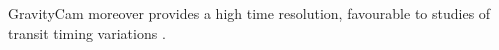 \documentclass{pasa}%
\begin{document}
GravityCam moreover provides a high time resolution, favourable to studies of transit timing variations \citep[e.g.][]{TTV,2009A&A...507..481C,2014A&A...565A...7C}.





\end{document}
